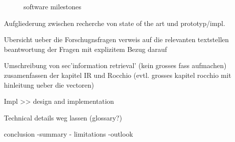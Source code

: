 \begin{figure}[h!]
\begin{tikzpicture}
    \end{tikzpicture}

    \caption[Software Milestones]{software milestones}
    \label{fig:softwaremilestones}
\end{figure}

{\color{red}
    Aufgliederung zwischen recherche von state of the art
    und prototyp/impl.



    Ubersicht ueber die Forschugnsfragen
    verweis auf die relevanten textstellen
    beantwortung der Fragen mit explizitem Bezug darauf

    Umschreibung von sec'information retrieval' (kein grosses fass aufmachen)
    zusamenfassen der kapitel IR und Rocchio (evtl. grosses kapitel rocchio mit hinleitung ueber die vectoren)


    Impl >> design and implementation

    Technical details weg lassen (glossary?)


    conclusion
        -summary
            - limitations
        -outlook
}
